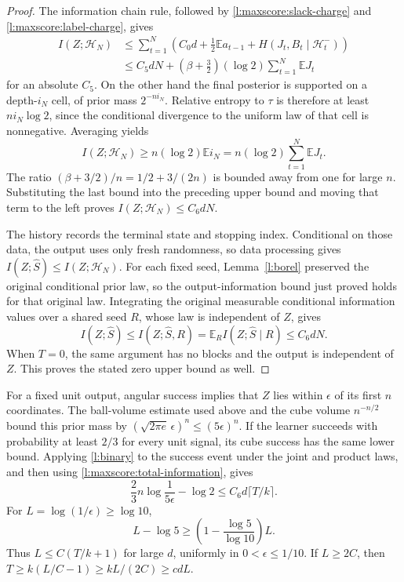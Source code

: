 \begin{proof}
The information chain rule, followed by
\eqref{l:maxscore:slack-charge} and \eqref{l:maxscore:label-charge},
gives
\[
 \begin{split}
 I(Z;\mathcal H_N)
 &\le\sum_{t=1}^N
 \left(C_0d+\tfrac12\mathbb E a_{t-1}
       +H(J_t,B_t\mid\mathcal H_t^-)\right)\\
 &\le C_5dN+
       (\beta+\tfrac32)(\log2)\sum_{t=1}^N\mathbb EJ_t
 \end{split}
\]
for an absolute \(C_5\).  On the other hand the final posterior
is supported on a depth-\(i_N\) cell, of prior mass \(2^{-ni_N}\).
Relative entropy to \(\tau\) is therefore at least
\(ni_N\log2\), since the conditional divergence to the uniform
law of that cell is nonnegative.  Averaging yields
\[
 I(Z;\mathcal H_N)\ge
 n(\log2)\mathbb Ei_N
 =n(\log2)\sum_{t=1}^N\mathbb EJ_t.
\]
The ratio \((\beta+3/2)/n=1/2+3/(2n)\) is bounded away from
one for large \(n\).  Substituting the last bound into the preceding
upper bound and moving that term to the left proves
\(I(Z;\mathcal H_N)\le C_6dN\).

The history records the terminal state and stopping index.  Conditional
on those data, the output uses only fresh randomness, so data processing
gives \(I(Z;\widehat S)\le I(Z;\mathcal H_N)\).
For each fixed seed, Lemma~\ref{l:borel} preserved the original
conditional prior law, so the output-information bound just proved
holds for that original law.  Integrating the original measurable
conditional information values over a shared seed \(R\), whose law
is independent of \(Z\), gives
\[
 I(Z;\widehat S)\le I(Z;\widehat S,R)
 =\mathbb E_R I(Z;\widehat S\mid R)\le C_6dN.
\]
When \(T=0\), the same argument has no blocks and the output is
independent of \(Z\).  This proves the stated zero upper bound as well.
\end{proof}

For a fixed unit output, angular success implies that \(Z\) lies
within \(\epsilon\) of its first \(n\) coordinates.  The ball-volume
estimate used above and the cube volume \(n^{-n/2}\) bound this
prior mass by \((\sqrt{2\pi e}\,\epsilon)^n\le(5\epsilon)^n\).
If the learner succeeds with probability at least \(2/3\) for every
unit signal, its cube success has the same lower bound.  Applying
\eqref{l:binary} to the success event under the joint and product
laws, and then using \eqref{l:maxscore:total-information}, gives
\begin{equation}\label{l:maxscore:accuracy}
 \frac23 n\log\frac1{5\epsilon}-\log2
 \le C_6d\lceil T/k\rceil.
\end{equation}
For \(L=\log(1/\epsilon)\ge\log10\),
\[
 L-\log5\ge
 \left(1-\frac{\log5}{\log10}\right)L.
\]
Thus \(L\le C(T/k+1)\) for large \(d\), uniformly in
\(0<\epsilon\le1/10\).  If \(L\ge2C\), then
\(T\ge k(L/C-1)\ge kL/(2C)\ge cdL\).


